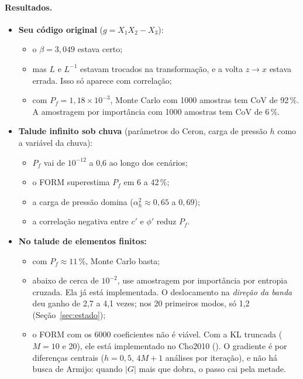 \paragraph{Resultados.}
\begin{itemize}
  \item \textbf{Seu código original} ($g = X_1X_2 - X_3$):
    \begin{itemize}
      \item o $\beta = 3{,}049$ estava certo;
      \item mas $L$ e $L^{-1}$ estavam trocados na transformação, e a volta $z \to x$ estava errada. Isso só aparece
        com correlação;
      \item com $P_f = 1{,}18\times10^{-3}$, Monte Carlo com 1000 amostras tem CoV de 92\,\%. A amostragem por
        importância com 1000 amostras tem CoV de 6\,\%.
    \end{itemize}
  \item \textbf{Talude infinito sob chuva} (parâmetros do Ceron, carga de pressão $h$ como a variável da chuva):
    \begin{itemize}
      \item $P_f$ vai de $10^{-12}$ a 0,6 ao longo dos cenários;
      \item o FORM superestima $P_f$ em 6 a 42\,\%;
      \item a carga de pressão domina ($\alpha_h^2 \approx 0{,}65$ a $0{,}69$);
      \item a correlação negativa entre $c'$ e $\phi'$ reduz $P_f$.
    \end{itemize}
  \item \textbf{No talude de elementos finitos:}
    \begin{itemize}
      \item com $P_f \approx 11\,\%$, Monte Carlo basta;
      \item abaixo de cerca de $10^{-2}$, use amostragem por importância por entropia cruzada. Ela já está implementada.
        O deslocamento na \emph{direção da banda} deu ganho de 2,7 a 4,1 vezes; nos 20 primeiros modos, só 1,2
        (Seção~\ref{sec:estado});
      \item o FORM com os 6000 coeficientes não é viável. Com a KL truncada ($M = 10$ e 20), ele está implementado no
        Cho2010 (). O gradiente é por diferenças centrais ($h = 0{,}5$, $4M + 1$ análises por
        iteração), e não há busca de Armijo: quando $|G|$ mais que dobra, o passo cai pela metade.
    \end{itemize}
\end{itemize}
